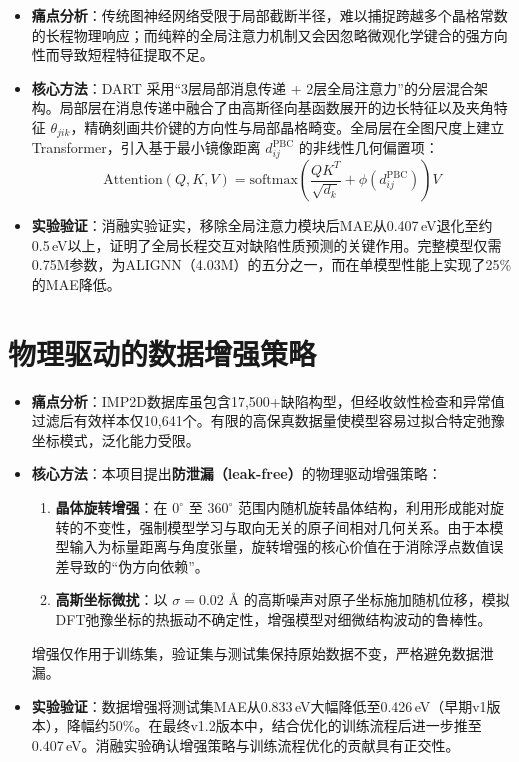 \begin{itemize}
    \item \textbf{痛点分析}：传统图神经网络受限于局部截断半径，难以捕捉跨越多个晶格常数的长程物理响应；而纯粹的全局注意力机制又会因忽略微观化学键合的强方向性而导致短程特征提取不足。

    \item \textbf{核心方法}：DART 采用``3层局部消息传递 + 2层全局注意力''的分层混合架构。局部层在消息传递中融合了由高斯径向基函数展开的边长特征以及夹角特征 $\theta_{jik}$，精确刻画共价键的方向性与局部晶格畸变。全局层在全图尺度上建立 Transformer，引入基于最小镜像距离 $d_{ij}^{\mathrm{PBC}}$ 的非线性几何偏置项：
    \[
    \mathrm{Attention}(Q, K, V) = \mathrm{softmax}\left(\frac{QK^T}{\sqrt{d_k}} + \phi(d_{ij}^{\mathrm{PBC}})\right) V
    \]

    \item \textbf{实验验证}：消融实验证实，移除全局注意力模块后MAE从0.407\,eV退化至约0.5\,eV以上，证明了全局长程交互对缺陷性质预测的关键作用。完整模型仅需0.75M参数，为ALIGNN（4.03M）的五分之一，而在单模型性能上实现了25\%的MAE降低。
\end{itemize}

\section{物理驱动的数据增强策略}

\begin{itemize}
    \item \textbf{痛点分析}：IMP2D数据库虽包含17,500+缺陷构型，但经收敛性检查和异常值过滤后有效样本仅10,641个。有限的高保真数据量使模型容易过拟合特定弛豫坐标模式，泛化能力受限。

    \item \textbf{核心方法}：本项目提出\textbf{防泄漏（leak-free）}的物理驱动增强策略：
    \begin{enumerate}
        \item \textbf{晶体旋转增强}：在 $0^\circ$ 至 $360^\circ$ 范围内随机旋转晶体结构，利用形成能对旋转的不变性，强制模型学习与取向无关的原子间相对几何关系。由于本模型输入为标量距离与角度张量，旋转增强的核心价值在于消除浮点数值误差导致的``伪方向依赖''。
        \item \textbf{高斯坐标微扰}：以 $\sigma = 0.02$ \AA{} 的高斯噪声对原子坐标施加随机位移，模拟DFT弛豫坐标的热振动不确定性，增强模型对细微结构波动的鲁棒性。
    \end{enumerate}
    增强仅作用于训练集，验证集与测试集保持原始数据不变，严格避免数据泄漏。

    \item \textbf{实验验证}：数据增强将测试集MAE从0.833\,eV大幅降低至0.426\,eV（早期v1版本），降幅约50\%。在最终v1.2版本中，结合优化的训练流程后进一步推至0.407\,eV。消融实验确认增强策略与训练流程优化的贡献具有正交性。
\end{itemize}


